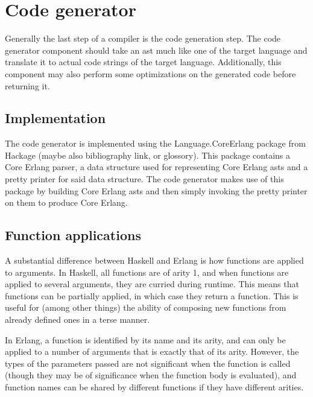 \section{Code generator}


Generally the last step of a compiler is the code generation step. The code generator
component should take an \gls{ast} much like one of the target language and translate it
to actual code strings of the target language. Additionally, this component may also
perform some optimizations on the generated code before returning it.

\subsection{Implementation}

The code generator is implemented using the Language.CoreErlang \cite{CoreErlang} package
from Hackage (maybe also bibliography link, or glossory). This package contains a Core Erlang
parser, a data structure used for representing Core Erlang \gls{ast}s and a pretty printer for
said data structure. The code generator makes use of this package by building Core Erlang
\gls{ast}s and then simply invoking the pretty printer on them to  produce Core Erlang.

\subsection{Function applications}

A substantial difference between Haskell and Erlang is how functions are applied to arguments. 
In Haskell, all functions are of arity 1, and when functions are applied to several arguments, they are curried during runtime. This means that functions can be partially applied, in which case they return a function. This is useful for (among other things) the ability of composing new functions from already defined ones in a terse manner.

In Erlang, a function is identified by its name and its arity, and can only be applied to a number of arguments that is exactly that of its arity. %
However, the types of the parameters passed are not significant when the function is called (though they may be of significance when the function body is evaluated), and function names can be shared by different functions if they have different arities.

